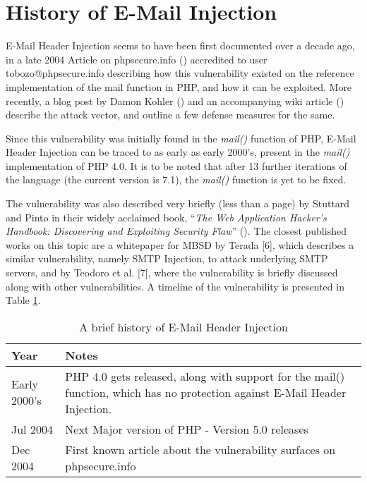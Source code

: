 \section{History of E-Mail Injection}

E-Mail Header Injection seems to have been first documented over a decade ago, in a late 2004 Article on phpsecure.info (\cite{Tobozo}) accredited to user tobozo@phpsecure.info describing how this vulnerability existed on the reference implementation of the mail function in PHP, and how it can be exploited. More recently, a blog post by Damon Kohler (\cite{DK}) and an accompanying wiki article (\cite{Injection}) describe the attack vector, and outline a few defense measures for the same.

Since this vulnerability was initially found in the \emph{mail()} function of PHP, E-Mail Header Injection can be traced to as early as early 2000's, present in the \emph{mail()} implementation of PHP 4.0. It is to be noted that after 13 further iterations of the language (the current version is 7.1), the \emph{mail()} function is yet to be fixed.

The vulnerability was also described very briefly (less than a page) by Stuttard and Pinto in their widely acclaimed book, ``\emph{The Web Application Hacker's Handbook: Discovering and Exploiting Security Flaw}'' (\cite{stuttard2011web}). 
The closest published works on this topic are a whitepaper for MBSD by Terada [6], which describes a similar vulnerability, namely SMTP Injection, to attack underlying SMTP servers, and by Teodoro et al. [7], where the vulnerability is briefly discussed along with other vulnerabilities.
A timeline of the vulnerability is presented in Table \ref{tab:history}.

\begin{table}[!htbp]
	\centering
	\begin{tabular}{|p{2cm}|p{10cm}|}
		\hline
		Year & Notes\\
		\hline
		{Early 2000's} & {PHP 4.0 gets released, along with support for the mail() function, which has no protection against E-Mail Header Injection.}\\
		\hline
		{Jul 2004} & {Next Major version of PHP - Version 5.0 releases}\\
		\hline
		{Dec 2004} & {First known article about the vulnerability surfaces on phpsecure.info}\\
		\hline		
	\end{tabular}
	\caption{A brief history of E-Mail Header Injection}
	\label{tab:history}
\end{table}